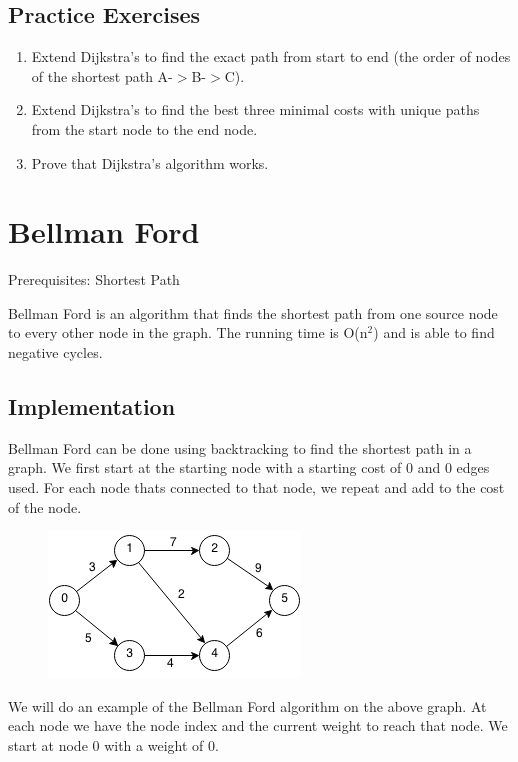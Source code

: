 \documentclass[11pt,oneside]{book}
\makeatletter
\def\maxwidth#1{\ifdim\Gin@nat@width>#1 #1\else\Gin@nat@width\fi}
\makeatother
\begin{document}
\subsection{Practice Exercises}

\begin{enumerate}
\item Extend Dijkstra's to find the exact path from start to end (the order of nodes of the shortest path A-$>$B-$>$C).
\item Extend Dijkstra's to find the best three minimal costs with unique paths from the start node to the end node.
\item Prove that Dijkstra's algorithm works.
\end{enumerate}

        \section{ Bellman Ford }
        

Prerequisites:  Shortest Path

Bellman Ford is an algorithm that finds the shortest path from one source node to every other node in the graph. The running time is O(n$^{2}$) and is able to find negative cycles.

\subsection{Implementation}

Bellman Ford can be done using backtracking to find the shortest path in a graph. We first start at the starting node with a starting cost of 0 and 0 edges used. For each node thats connected to that node, we repeat and add to the cost of the node.

\vspace{5px}\begin{figure}[H]\centering
        \includegraphics[width=0.66\maxwidth{\textwidth}]{bellmanford.png}
        \end{figure}

We will do an example of the Bellman Ford algorithm on the above graph. At each node we have the node index and the current weight to reach that node. We start at node 0 with a weight of 0.
\end{document}
